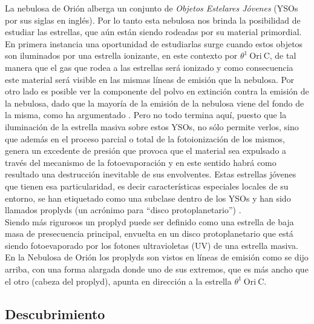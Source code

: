 La nebulosa de Orión alberga un conjunto de \textit{Objetos Estelares Jóvenes} (YSOs por sus siglas en inglés). Por lo tanto esta nebulosa nos brinda la posibilidad de estudiar las estrellas, que aún están siendo rodeadas por su material primordial. En primera instancia una oportunidad de estudiarlas surge cuando estos objetos son iluminados por una estrella ionizante, en este contexto  por \(\theta^1\ \text{Ori}\ \text{C}\), de tal manera que el gas que rodea a las estrellas será ionizado y como consecuencia este material será visible en las mismas líneas de emisión que la nebulosa. Por otro lado es posible ver la componente del polvo en extinción contra la emisión de la nebulosa, dado que la mayoría de la emisión de la nebulosa viene del fondo de la misma, como ha argumentado \citet{Odell:2008}. Pero no todo termina aquí, puesto que la iluminación de la estrella masiva sobre estos YSOs, no sólo permite verlos, sino que además en el proceso parcial o total de la fotoionización de los mismos, genera un excedente de presión que provoca que el material sea expulsado a través del mecanismo de la fotoevaporación y en este sentido habrá como resultado una destrucción inevitable de sus envolventes. Estas estrellas jóvenes que tienen esa particularidad, es decir características especiales locales de su entorno, se han etiquetado como una subclase dentro de los YSOs y han sido llamados proplyds (un acrónimo para ``disco protoplanetario'') \citep{Odell:1994}.\\

Siendo más rigurosos un proplyd puede ser definido como una estrella de baja masa de presecuencia principal, envuelta en un  disco protoplanetario que está siendo fotoevaporado por los fotones ultravioletas (UV) de una estrella masiva. En la Nebulosa de Orión los proplyds son vistos en líneas de emisión como se dijo arriba, con una forma alargada donde uno de sus extremos, que es más ancho que el otro (cabeza del proplyd), apunta en dirección a la estrella  \(\theta^1\ \text{Ori}\ \text{C}\). 

\subsection{ Descubrimiento}
\label{sec:descubrimiento-proplyds}

